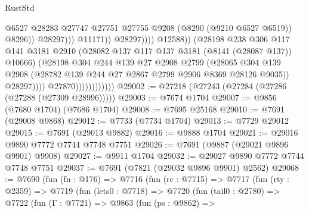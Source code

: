 \begin{lexlean}{RustStd}
\begin{coremodule}
                                                          @6527
                                                          @28283
                                                          @27747
                                                          @27751
                                                          @27755
                                                          @9208
                                                          (@8290 (@9210 @6527 @6519))
                                                          @8296))
                                                      @28297)))
                                                @11171))
                                            @28297))))
                                    @12588))
                                (@28198
                                  @238
                                  @306
                                  @117
                                  @141
                                  @3181
                                  @2910
                                  (@28082 @137 @117 @137 @3181 (@8141 (@28087 @137)) @10666)
                                  (@28198
                                    @304
                                    @244
                                    @139
                                    @27
                                    @2908
                                    @2799
                                    (@28065
                                      @304
                                      @139
                                      @2908
                                      (@28782 @139 @244 @27 @2867 @2799 @2906 @8369 @28126 @9035))
                                    @28297))))
                            @27870))))))))))))
@29002 := @27218 (@27243 (@27284 (@27286 (@27288 (@27309 @28996)))))
@29003 := @7674 @1704
@29007 := @9856 (@7680 @1704) (@7686 @1704)
@29008 := @7695 @25168
@29010 := @7691 (@29008 @9868)
@29012 := @7733 (@7734 @1704)
@29013 := @7729 @29012
@29015 := @7691 (@29013 @9882)
@29016 := @9888 @1704
@29021 := @29016 @9890 @7772 @7744 @7748 @7751
@29026 := @7691 (@9887 (@29021 @9896 @9901) @9908)
@29027 := @9911 @1704
@29032 := @29027 @9890 @7772 @7744 @7748 @7751
@29037 := @7691 (@7821 (@29032 @9896 @9901) @2562)
@29068 := @7690
    (fun (fn : @176) =>
    @7716
      (fun (rc : @7715) =>
      @7717
        (fun (rty : @2359) =>
        @7719
          (fun (lets0 : @7718) =>
          @7720
            (fun (tail0 : @2780) =>
            @7722
              (fun (Γ : @7721) =>
              @9863
                (fun (ps : @9862) =>

\end{coremodule}
\end{lexlean}
